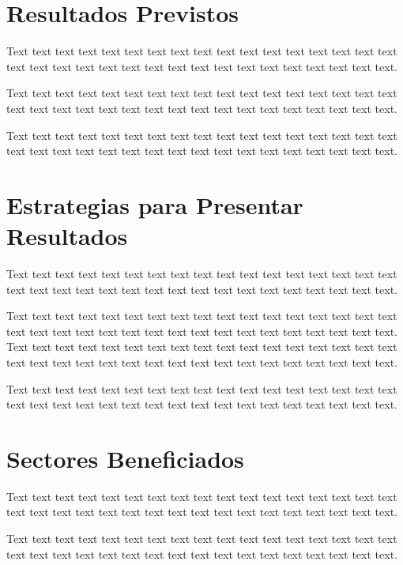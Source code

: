 \documentclass[12pt,a4paper]{article}
\begin{document}
\section{Resultados Previstos}
Text text text text text text text text text text text  text text text text text text text text text text text text text text text text text text text text text text text.

Text text text text text text text text text text text  text text text text text text text text text text text text text text text text text text text text text text text.

Text text text text text text text text text text text  text text text text text text text text text text text text text text text text text text text text text text text.
\section{Estrategias para Presentar Resultados}
Text text text text text text text text text text text  text text text text text text text text text text text text text text text text text text text text text text text.

Text text text text text text text text text text text  text text text text text text text text text text text text text text text text text text text text text text text.
Text text text text text text text text text text text  text text text text text text text text text text text text text text text text text text text text text text text.

Text text text text text text text text text text text  text text text text text text text text text text text text text text text text text text text text text text text.
\section{Sectores Beneficiados}
Text text text text text text text text text text text  text text text text text text text text text text text text text text text text text text text text text text text.

Text text text text text text text text text text text  text text text text text text text text text text text text text text text text text text text text text text text.
\end{document}
